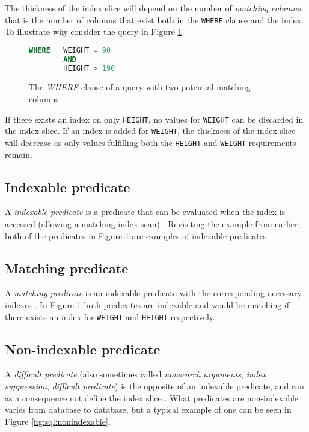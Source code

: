 The thickness of the index slice will depend on the number of \textit{matching columns}, that is the number of columns that exist both in the \texttt{WHERE} clause and the index. To illustrate why consider the query in Figure \ref{fig:sql:indexslice}.

\begin{figure}[ht]
\begin{lstlisting}[language=SQL]
WHERE   WEIGHT = 90
        AND
        HEIGHT > 190
\end{lstlisting}
\caption[The \textit{WHERE} clause of a query with two potential matching columns]{The \textit{WHERE} clause of a query with two potential matching columns.}\label{fig:sql:indexslice}
\end{figure}

If there exists an index on only \texttt{HEIGHT}, no values for \texttt{WEIGHT} can be discarded in the index slice. If an index is added for \texttt{WEIGHT}, the thickness of the index slice will decrease as only values fulfilling both the \texttt{HEIGHT} and \texttt{WEIGHT} requirements remain.

\subsection*{Indexable predicate}
A \textit{indexable predicate} is a predicate that can be evaluated when the index is accessed (allowing a matching index scan) \cite{2014_summary_sopp, 2013_ibm_ikcianp}. Revisiting the example from earlier, both of the predicates in Figure \ref{fig:sql:indexslice} are examples of indexable predicates.

\subsection*{Matching predicate}
A \textit{matching predicate} is an indexable predicate with the corresponding necessary indexes \cite{2013_ibm_ikcianp}. In Figure \ref{fig:sql:indexslice} both predicates are indexable and would be matching if there exists an index for \texttt{WEIGHT} and \texttt{HEIGHT} respectively.

\subsection*{Non-indexable predicate}
A \textit{difficult predicate} (also sometimes called \textit{nonsearch arguments}, \textit{index suppression}, \textit{difficult predicate}) is the opposite of an indexable predicate, and can as a consequence not define the index slice \cite{lahdenmaki_2005_relational_rdidatodossea}. What predicates are non-indexable varies from database to database, but a typical example of one can be seen in Figure \ref{fig:sql:nonindexable}.

